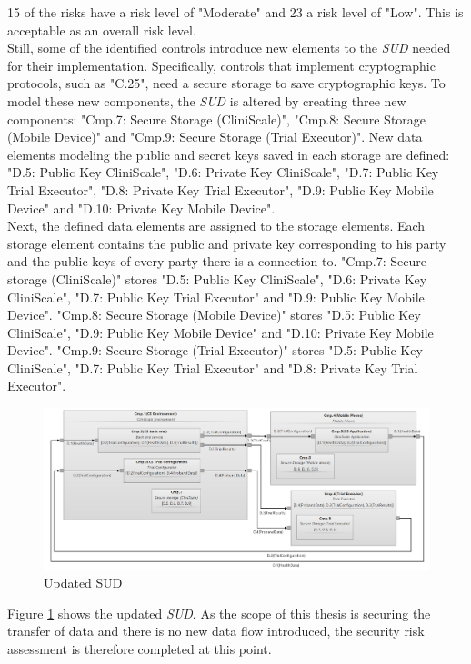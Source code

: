 15 of the risks have a risk level of "Moderate" and 23 a risk level of "Low". This is acceptable as an overall risk level.\\
Still, some of the identified controls introduce new elements to the \textit{SUD} needed for their implementation. Specifically, controls that implement cryptographic protocols, such as "C.25", need a secure storage to save cryptographic keys. To model these new components, the \textit{SUD} is altered by creating three new components: "Cmp.7: Secure Storage (CliniScale)", "Cmp.8: Secure Storage (Mobile Device)" and "Cmp.9: Secure Storage (Trial Executor)". New data elements modeling the public and secret keys saved in each storage are defined: "D.5: Public Key CliniScale", "D.6: Private Key CliniScale", "D.7: Public Key Trial Executor", "D.8: Private Key Trial Executor", "D.9: Public Key Mobile Device" and "D.10: Private Key Mobile Device". \\
Next, the defined data elements are assigned to the storage elements. Each storage element contains the public and private key corresponding to his party and the public keys of every party there is a connection to. "Cmp.7: Secure storage (CliniScale)" stores "D.5: Public Key CliniScale", "D.6: Private Key CliniScale", "D.7: Public Key Trial Executor" and "D.9: Public Key Mobile Device". "Cmp.8: Secure Storage (Mobile Device)" stores "D.5: Public Key CliniScale", "D.9: Public Key Mobile Device" and "D.10: Private Key Mobile Device". "Cmp.9: Secure Storage (Trial Executor)" stores "D.5: Public Key CliniScale", "D.7: Public Key Trial Executor" and "D.8: Private Key Trial Executor".\\
\newline

\begin{figure}
  \includegraphics[width=1.4\linewidth, angle=90]{images/phase2.png}
  \caption{Updated SUD}
  \label{fig:phase2}
\end{figure}

Figure \ref{fig:phase2} shows the updated \textit{SUD}. As the scope of this thesis is securing the transfer of data and there is no new data flow introduced, the security risk assessment is therefore completed at this point.





